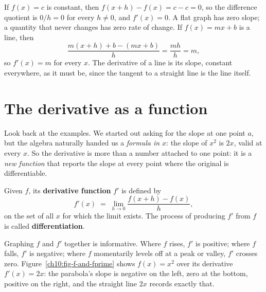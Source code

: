 \begin{example}
\label{ch10:ex-const-line}
If $f(x) = c$ is constant, then $f(x+h) - f(x) = c - c = 0$, so the difference
quotient is $0/h = 0$ for every $h \neq 0$, and $f'(x) = 0$. A flat graph has zero
slope; a quantity that never changes has zero rate of change. If $f(x) = mx + b$
is a line, then
\[
  \frac{m(x+h)+b - (mx+b)}{h} = \frac{mh}{h} = m,
\]
so $f'(x) = m$ for every $x$. The derivative of a line is its slope, constant
everywhere, as it must be, since the tangent to a straight line is
the line itself.
\end{example}

\section{The derivative as a function}
\label{ch10:deriv-as-function}

Look back at the examples. We started out asking for the slope at one point $a$,
but the algebra naturally handed us a \emph{formula in $x$}: the slope of $x^2$ is
$2x$, valid at every $x$. So the derivative is more than a number attached to
one point: it is a \emph{new function} that reports
the slope at every point where the original is differentiable.

\begin{definition}
\label{ch10:def-deriv-function}
Given $f$, its \textbf{derivative function} $f'$ is defined by
\[
  f'(x) \;=\; \lim_{h \to 0} \frac{f(x + h) - f(x)}{h},
\]
on the set of all $x$ for which the limit exists. The process of producing $f'$
from $f$ is called \textbf{differentiation}.
\end{definition}

Graphing $f$ and $f'$ together is informative. Where $f$ rises,
$f'$ is positive; where $f$ falls, $f'$ is negative; where $f$ momentarily levels
off at a peak or valley, $f'$ crosses zero. Figure~\ref{ch10:fig-f-and-fprime}
shows $f(x) = x^2$ over its derivative $f'(x) = 2x$: the parabola's slope is
negative on the left, zero at the bottom, positive on the right, and the straight
line $2x$ records exactly that.

